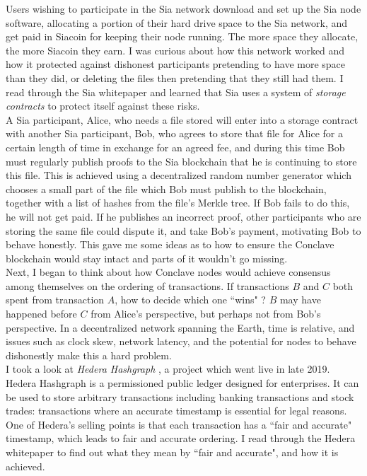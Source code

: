 \documentclass{report}
\begin{document}
	Users wishing to participate in the Sia network download and set up the Sia node software, allocating a portion of their hard drive space to the Sia network, and get paid in Siacoin for keeping their node running. The more space they allocate, the more Siacoin they earn. I was curious about how this network worked and how it protected against dishonest participants pretending to have more space than they did, or deleting the files then pretending that they still had them. I read through the Sia whitepaper and learned that Sia uses a system of \textit{storage contracts}  to protect itself against these risks. \\
	
	A Sia participant, Alice, who needs a file stored will enter into a storage contract with another Sia participant, Bob, who agrees to store that file for Alice for a certain length of time in exchange for an agreed fee, and during this time Bob must regularly publish proofs to the Sia blockchain that he is continuing to store this file. This is achieved using a decentralized random number generator which chooses a small part of the file which Bob must publish to the blockchain, together with a list of hashes from the file's Merkle tree. If Bob fails to do this, he will not get paid. If he publishes an incorrect proof, other participants who are storing the same file could dispute it, and take Bob's payment, motivating Bob to behave honestly. This gave me some ideas as to how to ensure the Conclave blockchain would stay intact and parts of it wouldn't go missing. \\
	
	Next, I began to think about how Conclave nodes would achieve consensus among themselves on the ordering of transactions. If transactions $B$ and $C$ both spent from transaction $A$, how to decide which one ``wins" ? $B$ may have happened before $C$ from Alice's perspective, but perhaps not from Bob's perspective. In a decentralized network spanning the Earth, time is relative, and issues such as clock skew, network latency, and the potential for nodes to behave dishonestly make this a hard problem. \\
	
	I took a look at \textit{Hedera Hashgraph} \cite{hedera},  a project which went live in late 2019. Hedera Hashgraph is a permissioned public ledger designed for enterprises. It can be used to store arbitrary transactions including banking transactions and stock trades: transactions where an accurate timestamp is essential for legal reasons. One of Hedera's selling points is that each transaction has a ``fair and accurate" timestamp, which leads to fair and accurate ordering. I read through the Hedera whitepaper to find out what they mean by ``fair and accurate", and how it is achieved. \\
	
\end{document}
